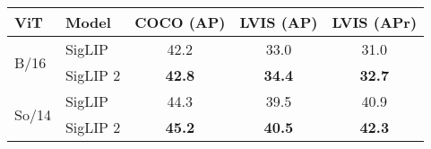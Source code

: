 \setlength{\tabcolsep}{0.5em}
\begin{tabular}{llccc}
\toprule
 ViT & Model & COCO (AP) & LVIS (AP) & LVIS (APr) \\
\midrule
\multirow[c]{2}{*}{B/16} & SigLIP & 42.2 & 33.0 & 31.0 \\
 & SigLIP 2 & \bf{42.8} & \bf{34.4} & \bf{32.7} \\
\midrule
\multirow[c]{2}{*}{So/14} & SigLIP & 44.3 & 39.5 & 40.9 \\
 & SigLIP 2 & \bf{45.2} & \bf{40.5} & \bf{42.3} \\
\bottomrule
\end{tabular}